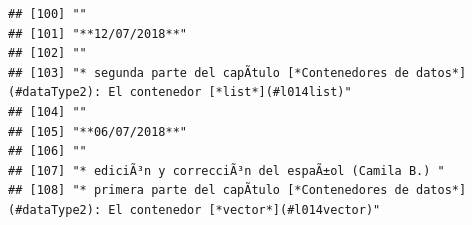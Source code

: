 \documentclass[
]{book}
\begin{document}
\begin{verbatim}
## [100] ""                                                                                                                                                                                                                                                                                                        
## [101] "**12/07/2018**"                                                                                                                                                                                                                                                                                          
## [102] ""                                                                                                                                                                                                                                                                                                        
## [103] "* segunda parte del capÃ­tulo [*Contenedores de datos*](#dataType2): El contenedor [*list*](#l014list)"                                                                                                                                                                                                  
## [104] ""                                                                                                                                                                                                                                                                                                        
## [105] "**06/07/2018**"                                                                                                                                                                                                                                                                                          
## [106] ""                                                                                                                                                                                                                                                                                                        
## [107] "* ediciÃ³n y correcciÃ³n del espaÃ±ol (Camila B.) "                                                                                                                                                                                                                                                      
## [108] "* primera parte del capÃ­tulo [*Contenedores de datos*](#dataType2): El contenedor [*vector*](#l014vector)"                                                                                                                                                                                              

\end{verbatim}
\end{document}
